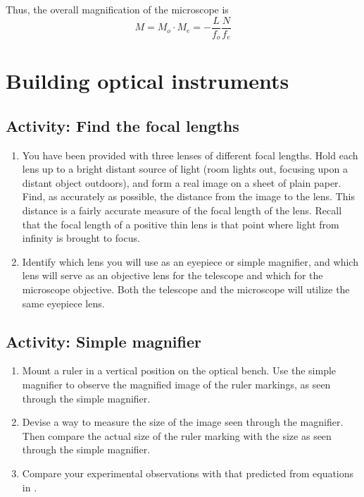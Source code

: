 \begin{multicols}{2}
Thus, the overall magnification of the microscope is
\begin{equation} \label{e:mscope}
	M = M_o \cdot M_e = -\frac{L}{f_o}\frac{N}{f_e}
\end{equation}


\section{Building optical instruments}
\subsection{Activity: Find the focal lengths}
\begin{enumerate}
	\item You have been provided with three lenses of different focal lengths.  Hold each lens up to a bright distant source of light (room lights out, focusing upon a distant object outdoors), and form a real image on a sheet of plain paper. Find, as accurately as possible, the distance from the image to the lens. This distance is a fairly accurate measure of the focal length of the lens. Recall that the focal length of a positive thin lens is that point where light from infinity is brought to focus. 

	\item Identify which lens you will use as an eyepiece or simple magnifier, and which lens will serve as an objective lens for the telescope and which for the microscope objective. Both the telescope and the microscope will utilize the same eyepiece lens.
\end{enumerate}

\subsection{Activity: Simple magnifier}
\begin{enumerate}
	 \item Mount a ruler in a vertical position on the optical bench. Use the simple magnifier to observe the magnified image of the ruler markings, as seen through the simple magnifier.
	 \item  Devise a way to measure the size of the image seen through the magnifier. Then compare the actual size of the ruler marking with the size as seen through the simple magnifier. 
	 \item Compare your experimental observations with that predicted from equations in .
\end{enumerate}


\end{multicols}
